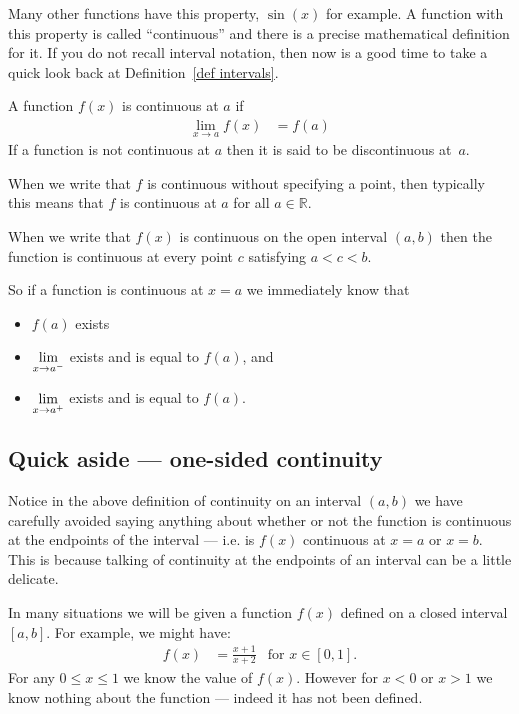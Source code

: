 Many other functions have this property, $\sin(x)$ for example. A function
with this property is called ``continuous'' and there is a precise mathematical definition
for it. If you do not recall interval notation, then now is a good time to take a quick
look back at Definition~\ref{def intervals}.
\begin{defn}
A function $f(x)$ is continuous at $a$ if
\begin{align*}
	\lim_{x \to a} f(x) &= f(a)
\end{align*}
If a function is not continuous at $a$ then it is said to be discontinuous
at~$a$.

When we write that $f$ is continuous without specifying a point, then typically
this means that $f$ is continuous at $a$ for all $a \in \mathbb{R}$.

When we write that $f(x)$ is continuous on the open interval $(a,b)$ then the function is
continuous at every point $c$ satisfying $a<c<b$.
\end{defn}

So if a function is continuous at $x=a$ we immediately know that
\begin{itemize}
 \item $f(a)$ exists
 \item $\displaystyle \lim_{x \to a^-}$ exists and is equal to $f(a)$, and
 \item $\displaystyle \lim_{x \to a^+}$ exists and is equal to $f(a)$.
\end{itemize}

\subsection*{Quick aside --- one-sided continuity}
Notice in the above definition of continuity on an interval $(a,b)$ we have carefully
avoided saying anything about whether or not the function is continuous at the endpoints
of the interval --- i.e. is $f(x)$ continuous at $x=a$ or $x=b$. This is because talking
of
continuity at the endpoints of an interval can be a little delicate.

In many situations we will be given a function $f(x)$ defined on a closed interval
$[a,b]$. For example, we might have:
\begin{align*}
  f(x) &= \frac{x+1}{x+2} & \text{for $x \in [0,1]$}.
\end{align*}
For any $0 \leq x \leq 1$ we know the value of $f(x)$. However for $x<0$ or $x>1$ we
know nothing about the function --- indeed it has not been defined.

